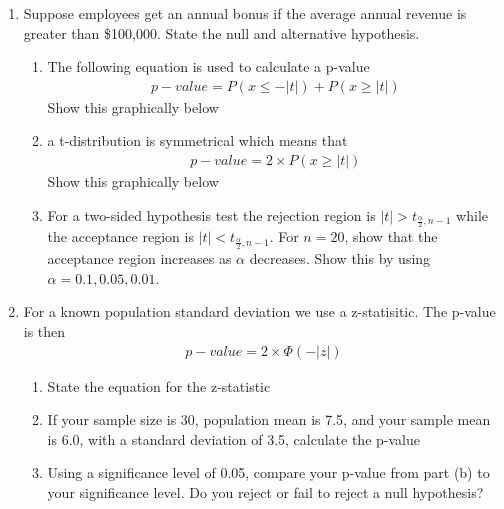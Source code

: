 
\begin{enumerate}
\item Suppose employees get an annual bonus if the average annual
  revenue is greater than \$100,000. State the null and alternative
  hypothesis.


\begin{enumerate}
\item The following equation is used to calculate a p-value
\begin{eqnarray*}
p-value = P(x \le -|t|) + P(x \ge |t|)
\end{eqnarray*}
Show this graphically below \\
\item a t-distribution is symmetrical which means that 
\begin{eqnarray*}
p-value = 2 \times P(x \ge |t|)
\end{eqnarray*}
Show this graphically below \\ 
\item For a two-sided hypothesis test the rejection region is $|t| > t_{\frac{\alpha}{2},n-1}$ while the acceptance region is $|t| < t_{\frac{\alpha}{2},n-1}$. For $n=20$, show that the acceptance region increases as $\alpha$ decreases. Show this by using $\alpha = 0.1, 0.05, 0.01$.
\end{enumerate}
\item For a known population standard deviation we use a z-statisitic. The p-value is then 
\begin{eqnarray*}
p-value = 2\times \Phi (-|z|)
\end{eqnarray*}
\begin{enumerate}
\item State the equation for the z-statistic
\item If your sample size is 30, population mean is 7.5, and your sample mean is 6.0, with a standard deviation of 3.5, calculate the p-value
\item Using a significance level of 0.05, compare your p-value from part (b) to your significance level. Do you reject or fail to reject a null hypothesis?
\end{enumerate}
\end{enumerate}
\newpage
